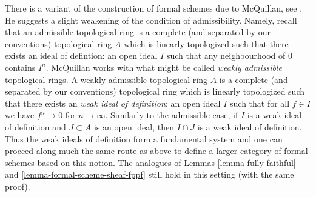\begin{remark}
\label{remark-mcquillan}
There is a variant of the construction of formal schemes due to
McQuillan, see \cite{McQuillan}.
He suggests a slight weakening of the condition of admissibility.
Namely, recall that an admissible topological ring is a complete
(and separated by our conventions) topological ring $A$
which is linearly topologized such that there exists an
ideal of defintion: an
open ideal $I$ such that any neighbourhood of $0$ contains $I^n$.
McQuillan works with what might be called {\it weakly admissible}
topological rings. A weakly admissible topological ring $A$ is a
complete (and separated by our conventions) topological ring
which is linearly topologized such that there exists an
{\it weak ideal of definition}: an open ideal $I$ such that
for all $f \in I$ we have
$f^n \to 0$ for $n \to \infty$. Similarly to the admissible case,
if $I$ is a weak ideal of definition and $J \subset A$ is an
open ideal, then $I \cap J$ is a weak ideal of definition.
Thus the weak ideals of definition form a fundamental system and
one can proceed along much the same route as above
to define a larger category of formal schemes based
on this notion. The analogues of Lemmas \ref{lemma-fully-faithful} and
\ref{lemma-formal-scheme-sheaf-fppf}
still hold in this setting (with the same proof).
\end{remark}

